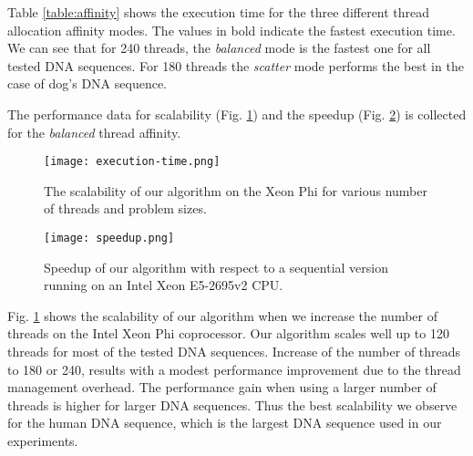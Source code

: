 \documentclass[conference]{IEEEtran}
\begin{document}
Table \ref{table:affinity} shows the execution time for the three different thread allocation affinity modes. The values in bold indicate the fastest execution time. We can see that for 240 threads, the \emph{balanced} mode is the fastest one for all tested DNA sequences. For 180 threads the \emph{scatter} mode performs the best in the case of dog's DNA sequence. 



The performance data for scalability (Fig. \ref{fig:execution}) and the speedup (Fig. \ref{fig:speedup}) is collected for the \emph{balanced} thread affinity. 

\begin{figure}
	\centering
	\texttt{[image: execution-time.png]}
	\caption{The scalability of our algorithm on the Xeon Phi for various number of threads and problem sizes.}
	\label{fig:execution}

\end{figure}

\begin{figure}
	\centering
	\texttt{[image: speedup.png]}
	\caption{Speedup of our algorithm with respect to a sequential version running on an Intel Xeon E5-2695v2 CPU.}
	\label{fig:speedup}
\end{figure}


Fig. \ref{fig:execution} shows the scalability of our algorithm when we increase the number of threads on the Intel Xeon Phi coprocessor. Our algorithm scales well up to 120 threads for most of the tested DNA sequences. Increase of the number of threads to 180 or 240, results with a modest performance improvement due to the thread management overhead. The performance gain when using a larger number of threads is higher for larger DNA sequences. Thus the best scalability we observe for the human DNA sequence, which is the largest DNA sequence used in our experiments. 
\end{document}

